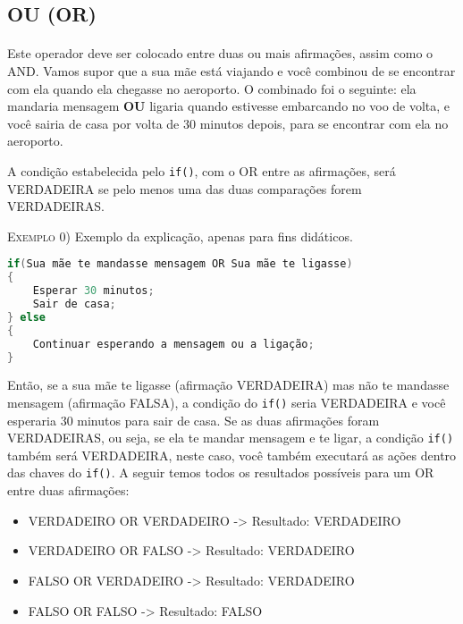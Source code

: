 \subsection{OU (OR)}
    \paragraph{}
    Este operador deve ser colocado entre duas ou mais afirmações, assim como o AND. Vamos supor que a sua mãe está viajando e você combinou de se encontrar com ela quando ela chegasse no aeroporto. O combinado foi o seguinte: ela mandaria mensagem \textbf{OU} ligaria quando estivesse embarcando no voo de volta, e você sairia de casa por volta de 30 minutos depois, para se encontrar com ela no aeroporto.
    
    \begin{center}
        A condição estabelecida pelo \lstinline[columns=fixed]{if()}, com o OR entre as afirmações, será VERDADEIRA se pelo menos uma das duas comparações forem VERDADEIRAS.
    \end{center}
   
    \textsc{Exemplo 0)} Exemplo da explicação, apenas para fins didáticos.
    \begin{lstlisting}[language=C]
if(Sua mãe te mandasse mensagem OR Sua mãe te ligasse)
{
    Esperar 30 minutos;
    Sair de casa;
} else
{
    Continuar esperando a mensagem ou a ligação;
}
\end{lstlisting}

    Então, se a sua mãe te ligasse (afirmação VERDADEIRA) mas não te mandasse mensagem (afirmação FALSA), a condição do \lstinline[columns=fixed]{if()} seria VERDADEIRA e você esperaria 30 minutos para sair de casa. Se as duas afirmações foram VERDADEIRAS, ou seja, se ela te mandar mensagem e te ligar, a condição \lstinline[columns=fixed]{if()} também será VERDADEIRA, neste caso, você também executará as ações dentro das chaves do \lstinline[columns=fixed]{if()}.
     A seguir temos todos os resultados possíveis para um OR entre duas afirmações:
     
     \begin{itemize}
        \item VERDADEIRO OR VERDADEIRO -> Resultado: VERDADEIRO
        \item VERDADEIRO OR FALSO -> Resultado: VERDADEIRO
        \item FALSO OR VERDADEIRO -> Resultado: VERDADEIRO
        \item FALSO OR FALSO -> Resultado: FALSO
    \end{itemize}
    
